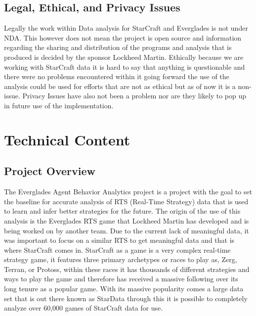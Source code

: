 \documentclass[a4paper,12pt]{report}
\begin{document}
\section{Legal, Ethical, and Privacy Issues}

Legally the work within Data analysis for StarCraft and Everglades is not under NDA. This however does not mean the project is open source and information regarding the sharing and distribution of the programs and analysis that is produced is decided by the sponsor Lockheed Martin. Ethically because we are working with StarCraft data it is hard to say that anything is questionable and there were no problems encountered within it going forward the use of the analysis could be used for efforts that are not as ethical but as of now it is a non-issue. Privacy Issues have also not been a problem nor are they likely to pop up in future use of the implementation.

\chapter{Technical Content}
\section{Project Overview}

The Everglades Agent Behavior Analytics project is a project with the goal to set the baseline for accurate analysis of RTS (Real-Time Strategy) data that is used to learn and infer better strategies for the future. The origin of the use of this analysis is the Everglades RTS game that Lockheed Martin has developed and is being worked on by another team. Due to the current lack of meaningful data, it was important to focus on a similar RTS to get meaningful data and that is where StarCraft comes in. StarCraft as a game is a very complex real-time strategy game, it features three primary archetypes or races to play as, Zerg, Terran, or Protoss, within these races it has thousands of different strategies and ways to play the game and therefore has received a massive following over its long tenure as a popular game. With its massive popularity comes a large data set that is out there known as StarData through this it is possible to completely analyze over 60,000 games of StarCraft data for use.
\end{document}
